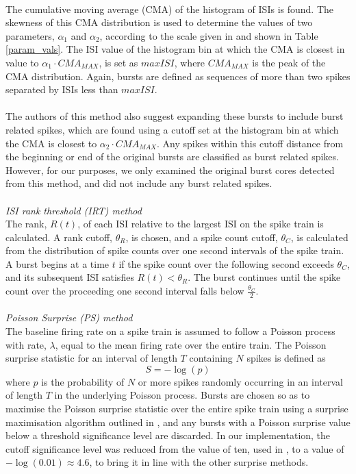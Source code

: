 \documentclass[12pt, titlepage]{article}
\begin{document}
\\The cumulative moving average (CMA) of the histogram of ISIs is found. The skewness of this CMA distribution is used to determine the values of two parameters, $\alpha_1$ and $\alpha_2$,  according to the scale given in \cite{Kapucu2012} and shown in Table \ref{param_vals}. The ISI value of the histogram bin at which the CMA is closest in value to $\alpha_1 \cdot CMA_{MAX}$, is set as $maxISI$, where $CMA_{MAX}$ is the peak of the CMA distribution. Again, bursts are defined as sequences of more than two spikes separated by ISIs less than $maxISI$.
\\ \\ The authors of this method also suggest expanding these bursts to include burst related spikes, which are found using a cutoff set at the histogram bin at which the CMA is closest to $\alpha_2 \cdot CMA_{MAX}$. Any spikes within this cutoff distance from the beginning or end of the original bursts are classified as burst related spikes. However, for our purposes, we only examined the original burst cores detected from this method, and did not include any burst related spikes.
\\ \\ \textit{ISI rank threshold (IRT) method \cite{Hennig2011}}
\\The rank, $R(t)$, of each ISI relative to the largest ISI on the spike train is calculated. A rank cutoff, $\theta_R$, is chosen, and a spike count cutoff, $\theta_C$, is calculated from the distribution of spike counts over one second intervals of the spike train. A burst begins at a time $t$ if the spike count over the following second exceeds $\theta_C$, and its subsequent ISI satisfies $R(t)<\theta_R$. The burst continues until the spike count over the proceeding one second interval falls below $\frac{\theta_C}{2}$.
\\ \\ \textit{Poisson Surprise (PS) method \cite{Legendy1985}}
\\The baseline firing rate on a spike train is assumed to follow a Poisson process with rate, $\lambda$, equal to the mean firing rate over the entire train. The Poisson surprise statistic for an interval of length $T$ containing $N$ spikes is defined as 
\[S = -\log(p)\] 
where $p$ is the probability of $N$ or more spikes randomly occurring in an interval of length $T$ in the underlying Poisson process. Bursts are chosen so as to maximise the Poisson surprise statistic over the entire spike train using a surprise maximisation algorithm outlined in \cite{Legendy1985}, and any bursts with a Poisson surprise value below a threshold significance level are discarded. In our implementation, the cutoff significance level was reduced from the value of ten, used in \cite{Legendy1985}, to a value of $-\log(0.01)\approx 4.6$, to bring it in line with the other surprise methods.
\end{document}
